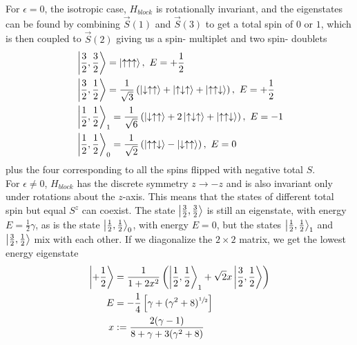 \documentclass[../rsrg.tex,../../main.tex]{subfiles}
\begin{document}
For $\epsilon=0$, the isotropic case, $H_{block}$ is rotationally invariant, and the eigenstates can be found by combining $\vec{S}(1)$ and $\vec{S}(3)$ to get a total spin of $0$ or $1$, which is then coupled to $\vec{S}(2)$ giving us a spin- multiplet and two spin- doublets
\begin{equation}
    \begin{split}
        &\ket{\frac{3}{2},\frac{3}{2}}=\ket{\uparrow\uparrow\uparrow},\ E=+\frac{1}{2}\\
        &\ket{\frac{3}{2},\frac{1}{2}}=\frac{1}{\sqrt{3}}\left(\ket{\downarrow\uparrow\uparrow}+\ket{\uparrow\downarrow\uparrow}+\ket{\uparrow\uparrow\downarrow}\right),\ E=+\frac{1}{2}\\
        &\ket{\frac{1}{2},\frac{1}{2}}_{1}=\frac{1}{\sqrt{6}}\left(\ket{\downarrow\uparrow\uparrow}+2\ket{\uparrow\downarrow\uparrow}+\ket{\uparrow\uparrow\downarrow}\right),\ E=-1\\
        &\ket{\frac{1}{2},\frac{1}{2}}_{0}=\frac{1}{\sqrt{2}}\left(\ket{\uparrow\uparrow\downarrow}-\ket{\downarrow\uparrow\uparrow}\right),\ E=0
    \end{split}
\end{equation}
plus the four corresponding to all the spins flipped with negative total $S$.\\

For $\epsilon\ne0$, $H_{block}$ has the discrete symmetry $z\rightarrow-z$ and is also invariant only under rotations about the $z$-axis. This means that the states of different total spin but equal $S^{z}$ can coexist. The state $\ket{\frac{3}{2},\frac{3}{2}}$ is still an eigenstate, with energy $E=\frac{1}{2}\gamma$, as is the state $\ket{\frac{1}{2},\frac{1}{2}}_{0}$, with energy $E=0$, but the states $\ket{\frac{1}{2},\frac{1}{2}}_{1}$ and $\ket{\frac{3}{2},\frac{1}{2}}$ mix with each other. If we diagonalize the $2\times 2$ matrix, we get the lowest energy eigenstate
\begin{equation}
\begin{split}
        \ket{+\frac{1}{2}}&=\frac{1}{1+2x^{2}}\left( \ket{\frac{1}{2},\frac{1}{2}}_{1}+ \sqrt{2}x\ket{\frac{3}{2},\frac{1}{2}}\right)\\
        E&=-\frac{1}{4}\left[ \gamma+(\gamma^{2}+8)^{\sfrac{1}{2}}\right]\\
        x&:=\frac{2(\gamma-1)}{8+\gamma+3(\gamma^{2}+8)}
\end{split}
\end{equation}
\end{document}

